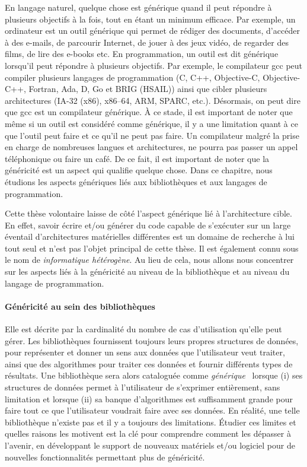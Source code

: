 En langage naturel, quelque chose est générique quand il peut répondre à plusieurs objectifs à la fois, tout en étant un
minimum efficace. Par exemple, un ordinateur est un outil générique qui permet de rédiger des documents, d'accéder à des
e-mails, de parcourir Internet, de jouer à des jeux vidéo, de regarder des films, de lire des e-books etc. En
programmation, un outil est dit générique lorsqu'il peut répondre à plusieurs objectifs. Par exemple, le compilateur gcc
peut compiler plusieurs langages de programmation (C, C++, Objective-C, Objective-C++, Fortran, Ada, D, Go et BRIG
(HSAIL)) ainsi que cibler plusieurs architectures (IA-32 (x86), x86--64, ARM, SPARC, etc.). Désormais, on peut dire que
gcc est un compilateur générique. À ce stade, il est important de noter que même si un outil est considéré comme
générique, il y a une limitation quant à ce que l'outil peut faire et ce qu'il ne peut pas faire. Un compilateur malgré
la prise en charge de nombreuses langues et architectures, ne pourra pas passer un appel téléphonique ou faire un café.
De ce fait, il est important de noter que la généricité est un aspect qui qualifie quelque chose. Dans ce chapitre, nous
étudions les aspects génériques liés aux bibliothèques et aux langages de programmation.

Cette thèse volontaire laisse de côté l'aspect générique lié à l'architecture cible. En effet, savoir écrire et/ou
générer du code capable de s'exécuter sur un large éventail d'architectures matérielles différentes est un domaine de
recherche à lui tout seul et n'est pas l'objet principal de cette thèse. Il est également connu sous le nom de
\emph{informatique hétérogène}. Au lieu de cela, nous allons nous concentrer sur les aspects liés à la généricité au
niveau de la bibliothèque et au niveau du langage de programmation.

\paragraph{Généricité au sein des bibliothèques} Elle est décrite par la cardinalité du nombre de cas d'utilisation
qu'elle peut gérer. Les bibliothèques fournissent toujours leurs propres structures de données, pour représenter et
donner un sens aux données que l'utilisateur veut traiter, ainsi que des algorithmes pour traiter ces données et fournir
différents types de résultats. Une bibliothèque sera alors cataloguée comme
\emph{générique}~\parencite{musser.1994.algorithm} lorsque (i) ses structures de données permet à l'utilisateur de
s'exprimer entièrement, sans limitation et lorsque (ii) sa banque d'algorithmes est suffisamment grande pour faire tout
ce que l'utilisateur voudrait faire avec ses données. En réalité, une telle bibliothèque n'existe pas et il y a toujours
des limitations. Étudier ces limites et quelles raisons les motivent est la clé pour comprendre comment les dépasser à
l'avenir, en développant le support de nouveaux matériels et/ou logiciel pour de nouvelles fonctionnalités permettant
plus de généricité.

